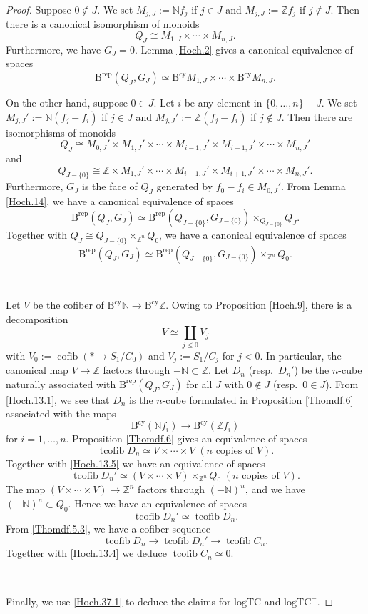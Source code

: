 \documentclass[10pt,a4paper]{amsart}
\newcommand{\Bcy}{\operatorname{B^{cy}}}
\newcommand{\Brep}{\operatorname{B^{rep}}}
\newcommand{\N}{\mathbb{N}}
\newcommand{\Z}{\mathbb{Z}}
\newcommand{\cofib}{\operatorname{cofib}}
\newcommand{\logTC}{\mathrm{logTC}}
\newcommand{\tcofib}{\operatorname{tcofib}}
\begin{document}
\begin{proof}
Suppose $0\notin J$.
We set $M_{j,J}:=\N f_j$ if $j\in J$ and $M_{j,J}:=\Z f_j$ if $j\notin J$.
Then there is a canonical isomorphism of monoids
\[
Q_J\cong M_{1,J}\times \cdots \times M_{n,J}.
\]
Furthermore, we have $G_J=0$.
Lemma \ref{Hoch.2} gives a canonical equivalence of spaces
\begin{equation}
\label{Hoch.13.1}
\Brep (Q_J,G_J)
\simeq
\Bcy M_{1,J}
\times
\cdots
\times
\Bcy M_{n,J}.
\end{equation}

On the other hand, suppose $0\in J$.
Let $i$ be any element in $\{0,\ldots,n\}-J$.
We set $M_{j,J}':=\N(f_j-f_i)$ if $j\in J$ and $M_{j,J}':=\Z(f_j-f_i)$ if $j\notin J$.
Then there are isomorphisms of monoids
\[
Q_J
\cong
M_{0,J}'\times M_{1,J}'\times \cdots \times M_{i-1,J}'\times M_{i+1,J}'\times \cdots \times M_{n,J}'
\]
and
\[
Q_{J-\{0\}}
\cong
\Z\times M_{1,J}'\times \cdots \times M_{i-1,J}'\times M_{i+1,J}'\times \cdots \times M_{n,J}'.
\]
Furthermore, $G_J$ is the face of $Q_J$ generated by $f_0-f_i\in M_{0,J}'$.
From Lemma \ref{Hoch.14}, we have a canonical equivalence of spaces
\begin{equation}
\label{Hoch.13.3}
\Brep (Q_J,G_J)
\simeq
\Brep (Q_{J-\{0\}},G_{J-\{0\}})\times_{Q_{J-\{0\}}}Q_J.
\end{equation}
Together with $Q_J\cong Q_{J-\{0\}}\times_{\Z^n} Q_0$, we have a canonical equivalence of spaces
\begin{equation}
\label{Hoch.13.5}
\Brep (Q_J,G_J)
\simeq
\Brep (Q_{J-\{0\}},G_{J-\{0\}}) \times_{\Z^n}Q_0.
\end{equation}

\

Let $V$ be the cofiber of $\Bcy \N\to \Bcy \Z$.
Owing to Proposition \ref{Hoch.9}, there is a decomposition
\[
V
\simeq
\coprod_{j\leq 0} V_j
\]
with $V_0:=\cofib(*\to S_1/C_0)$ and $V_j:=S_1/C_j$ for $j<0$.
In particular, the canonical map $V\to \Z$ factors through $-\N\subset \Z$.
Let $D_n$ (resp.\ $D_n'$) be the $n$-cube naturally associated with $\Brep (Q_J,G_J)$ for all $J$ with $0\notin J$ (resp.\ $0\in J$).
From \eqref{Hoch.13.1}, we see that $D_n$ is the $n$-cube formulated in Proposition \ref{Thomdf.6} associated with the maps
\[
\Bcy (\N f_i)
\to
\Bcy (\Z f_i)
\]
for $i=1,\ldots,n$.
Proposition \ref{Thomdf.6} gives an equivalence of spaces
\[
\tcofib D_n
\simeq
V\times \cdots \times V
\;
(n\text{ copies of }V).
\]
Together with \eqref{Hoch.13.5} we have an equivalence of spaces
\[
\tcofib D_n'
\simeq
(V\times \cdots \times V)\times_{\Z^n}Q_0
\;
(n\text{ copies of }V).
\]
The map $(V\times \cdots \times V)\to \Z^n$ factors through $(-\N)^n$, and we have $(-\N)^n\subset Q_0$.
Hence we have an equivalence of spaces
\begin{equation}
\label{Hoch.13.4}
\tcofib D_n'
\simeq
\tcofib D_n.
\end{equation}
From \eqref{Thomdf.5.3}, we have a cofiber sequence
\[
\tcofib D_n\to \tcofib D_n'\to \tcofib C_n.
\]
Together with \eqref{Hoch.13.4} we deduce $\tcofib C_n\simeq 0$.

\

Finally, we use \eqref{Hoch.37.1} to deduce the claims for $\logTC$ and $\logTC^-$.
\end{proof}
\end{document}
